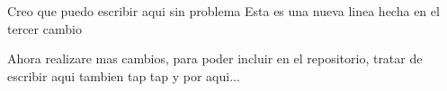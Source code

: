 Creo que puedo escribir aqui sin problema
Esta es una nueva linea hecha en el tercer cambio

Ahora realizare mas cambios, para poder incluir en el repositorio, tratar de escribir aqui tambien
tap
tap
y por aqui...
